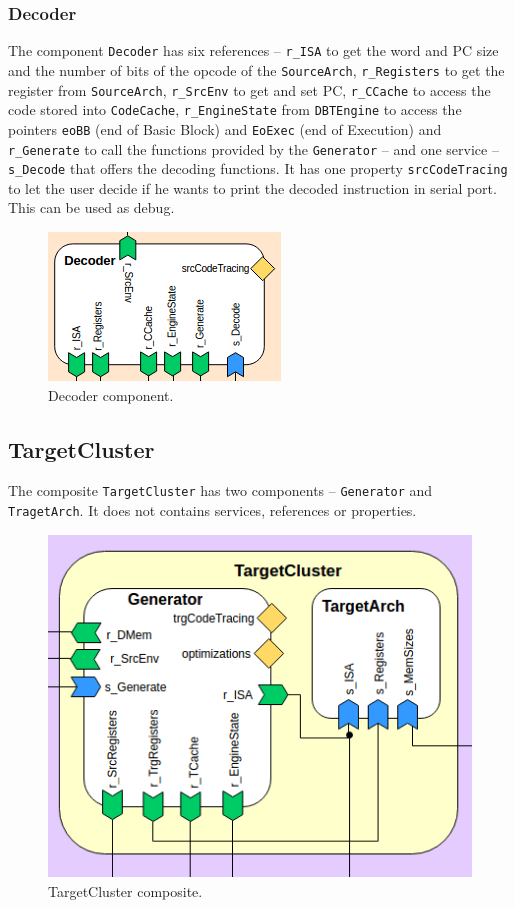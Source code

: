 \documentclass{report}
\begin{document}
			\subsubsection{Decoder}
			
			\par The component \texttt{Decoder} has six references -- \texttt{r\_ISA} to get the word and PC size and the number of bits of the opcode of the \texttt{SourceArch}, \texttt{r\_Registers} to get the register from \texttt{SourceArch}, \texttt{r\_SrcEnv} to get and set PC, \texttt{r\_CCache} to access the code stored into \texttt{CodeCache}, \texttt{r\_EngineState} from \texttt{DBTEngine} to access the pointers \texttt{eoBB} (end of Basic Block) and \texttt{EoExec} (end of Execution) and \texttt{r\_Generate} to call the functions provided by the \texttt{Generator} -- and one service -- \texttt{s\_Decode} that offers the decoding functions. It has one property \texttt{srcCodeTracing} to let the user decide if he wants to print the decoded instruction in serial port. This can be used as debug. 
			
			\begin{figure} [H]
				\centering
				\includegraphics[width=0.45\linewidth]{Images/arch-ref/Decoder}
				\caption{Decoder component.}
				\label{fig:Decoder}
			\end{figure}			
		
		
		\subsection{TargetCluster}
		
		\par The composite \texttt{TargetCluster} has two components -- \texttt{Generator} and \texttt{TragetArch}. It does not contains services, references or properties.
		
		\begin{figure} [H]
			\centering
			\includegraphics[width=0.6\linewidth]{Images/arch-ref/TargetCluster}
			\caption{TargetCluster composite.}
			\label{fig:TargetCluster}
		\end{figure}
		
\end{document}
